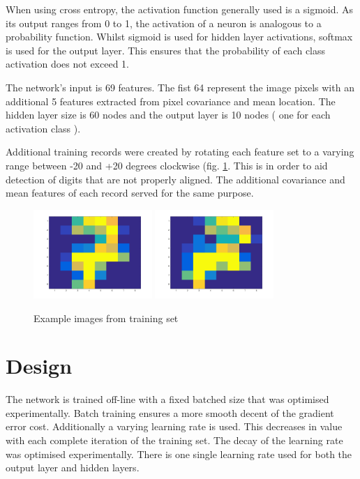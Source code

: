 \documentclass[11]{article}
\begin{document}
When using cross entropy, the activation function generally used is a sigmoid. As its output ranges from 0 to 1, the activation of a neuron is analogous to a probability function. Whilst sigmoid is used for hidden layer activations, softmax is used for the output layer. This ensures that the probability of each class activation does not exceed 1. 

The network's input is 69 features. The fist 64 represent the image pixels with an additional 5 features extracted from pixel covariance and mean location.  The hidden layer size is 60 nodes and the output layer is 10 nodes ( one for each activation class ). 

Additional training records were created by rotating each feature set to a varying range between -20 and +20 degrees clockwise (fig. \ref{fig:rotated}. This is in order to aid detection of digits that are not properly aligned. The additional covariance and mean features of each record served for the same purpose. 
\begin{figure}[h]
\centering
\includegraphics[width=0.4\textwidth]{seven.png}
\includegraphics[width=0.4\textwidth]{seven_rotated.png}
\caption{Example images from training set}
\label{fig:rotated}
\end{figure}
\section{Design}

The network is trained off-line with a fixed batched size that was optimised experimentally. Batch training ensures a more smooth decent of the gradient error cost. Additionally a varying learning rate is used. This decreases in value with each complete iteration of the training set. The decay of the learning rate was optimised experimentally. There is one single learning rate used for both the output layer and hidden layers.
\end{document}

